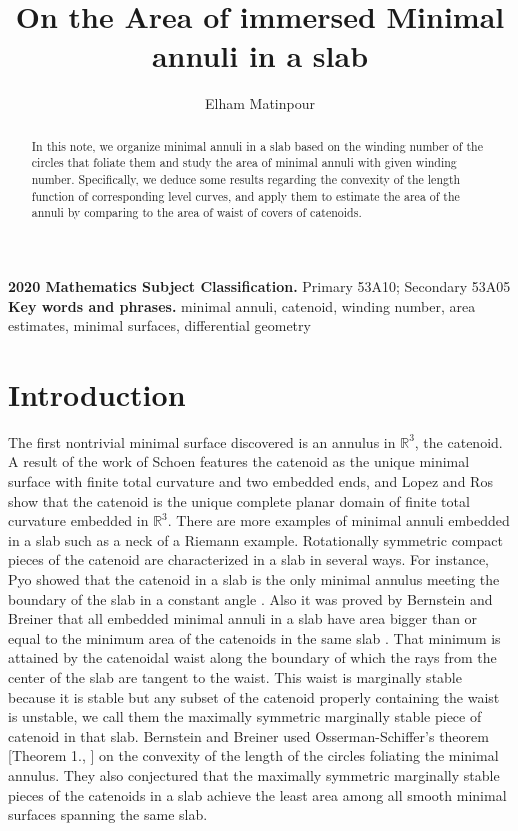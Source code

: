 \documentclass[11pt]{amsart}
\author{Elham Matinpour}
\title{On the Area of immersed Minimal annuli in a slab}
\numberwithin{equation}{section}
\theoremstyle{theorem}
\theoremstyle{definition}
\numberwithin{equation}{section}
\begin{document}
\maketitle

\begin{abstract}
In this note, we organize minimal annuli in a slab based on the winding number of the circles that foliate them and study the area of minimal annuli with given winding number. Specifically, we deduce some results regarding the convexity of the length function of corresponding level curves, and apply them to estimate the area of the annuli by comparing to the area of waist of covers of catenoids.
\end{abstract}

{\footnotesize
\textbf{2020 Mathematics Subject Classification.} Primary 53A10; Secondary 53A05\\
\textbf{Key words and phrases.} minimal annuli, catenoid, winding number, area estimates, minimal surfaces, differential geometry
}


\section{Introduction}
The first nontrivial minimal surface discovered is an annulus in $\mathbb{R}^3$, the catenoid. A result of the work of Schoen \cite{schoen1983uniqueness} features the catenoid as the unique minimal surface with finite total curvature and two embedded ends, and Lopez and Ros \cite{lopez1991embedded} show that the catenoid is the unique complete planar domain of finite total curvature embedded in $\mathbb{R}^3$. There are more examples of minimal annuli embedded in a slab such as a neck of a Riemann example. Rotationally symmetric compact pieces of the catenoid are characterized in a slab in several ways. For instance, Pyo showed that the catenoid in a slab is the only minimal annulus meeting the boundary of the slab in a constant angle \cite{pyo2009minimal}. Also it was proved by Bernstein and Breiner that all embedded minimal annuli in a slab have area bigger than or equal to the minimum area of the catenoids in the same slab \cite{bernstein2014variational}. That minimum is attained by the catenoidal waist along the boundary of which the rays from the center of the slab are tangent to the waist. This waist is marginally stable because it is stable but any subset of the catenoid properly containing the waist is unstable, we call them the maximally symmetric marginally stable piece of catenoid in that slab. Bernstein and Breiner used Osserman-Schiffer's theorem [Theorem 1., \cite{osserman1975doubly}] on the convexity of the length of the circles foliating the minimal annulus. They also conjectured that the maximally symmetric marginally stable pieces of the catenoids in a slab achieve the least area among all smooth minimal surfaces spanning the same  slab. 
\medskip
\end{document}
